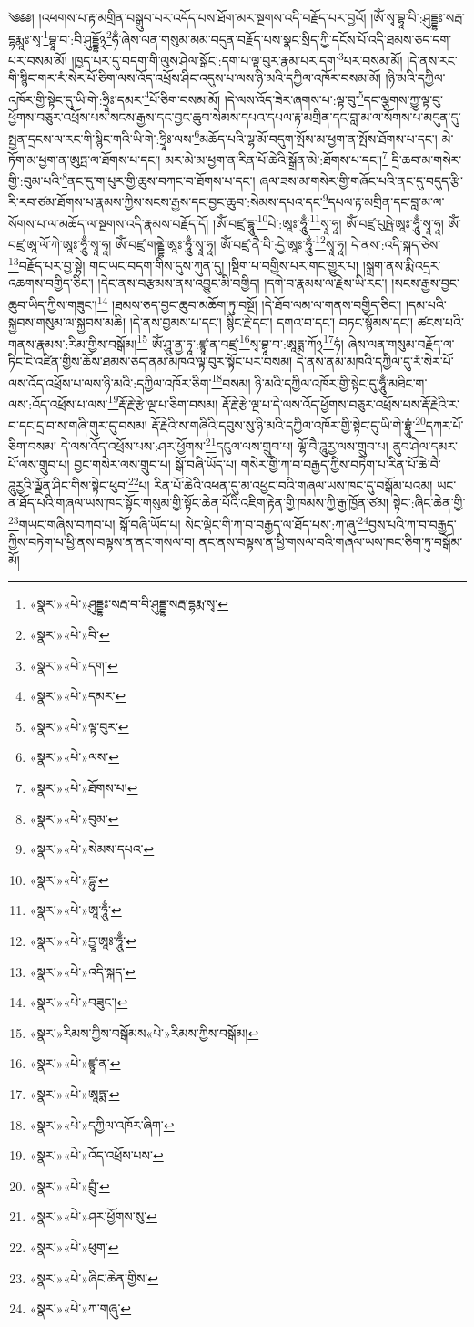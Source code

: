 ༄༅༅། །འཕགས་པ་རྟ་མགྲིན་བསྒྲུབ་པར་འདོད་པས་ཐོག་མར་སྔགས་འདི་བརྗོད་པར་བྱའོ། །ཨོཾ་སྭ་བྷཱ་བི་:ཤུདྡྷཿ་སརྦ་དྷརྨཱཿ་སྭ་\footnote{«སྣར་»«པེ་»ཤུདྡྷཿ་སརྦ་བ་བི་ཤུདྡྷ་སརྦ་དྷརྨ་སྭ་}བྷཱ་བ་:བི་ཤུདྡྷོ྅\footnote{«སྣར་»«པེ་»བི་}ཧྃ་ཞེས་ལན་གསུམ་མམ་བདུན་བརྗོད་པས་སྣང་སྲིད་ཀྱི་དངོས་པོ་འདི་ཐམས་ཅད་དག་པར་བསམ་མོ། །ཁྱད་པར་དུ་བདག་གི་ལུས་ཤེལ་སྒོང་:དག་པ་ལྟ་བུར་རྣམ་པར་དག་\footnote{«སྣར་»«པེ་»དག་}པར་བསམ་མོ། །དེ་ནས་རང་གི་སྙིང་གར་རཾ་སེར་པོ་ཅིག་ལས་འོད་འཕྲོས་ཤིང་འདུས་པ་ལས་ཉི་མའི་དཀྱིལ་འཁོར་བསམ་མོ། །ཉི་མའི་དཀྱིལ་འཁོར་གྱི་སྟེང་དུ་ཡི་གེ་:ཧྲཱིཿ་དམར་\footnote{«སྣར་»«པེ་»དམར་}པོ་ཅིག་བསམ་མོ། །དེ་ལས་འོད་ཟེར་ཞགས་པ་:ལྟ་བུ་\footnote{«སྣར་»«པེ་»ལྟ་བུར་}དང་ལྕགས་ཀྱུ་ལྟ་བུ་ཕྱོགས་བཅུར་འཕྲོས་པས་སངས་རྒྱས་དང་བྱང་ཆུབ་སེམས་དཔའ་དཔལ་རྟ་མགྲིན་དང་བླ་མ་ལ་སོགས་པ་མདུན་དུ་སྤྱན་དྲངས་ལ་རང་གི་སྙིང་གའི་ཡི་གེ་:ཧྲཱིཿ་ལས་\footnote{«སྣར་»«པེ་»ལས་}མཆོད་པའི་ལྷ་མོ་བདུག་སྤོས་མ་ཕྱག་ན་སྤོས་ཐོགས་པ་དང་། མེ་ཏོག་མ་ཕྱག་ན་ཨུཏྤ་ལ་ཐོགས་པ་དང་། མར་མེ་མ་ཕྱག་ན་རིན་པོ་ཆེའི་སྒྲོན་མེ་:ཐོགས་པ་དང་།\footnote{«སྣར་»«པེ་»ཐོགས་པ།} དྲི་ཆབ་མ་གསེར་གྱི་:བུམ་པའི་\footnote{«སྣར་»«པེ་»བུམ་}ནང་དུ་ག་པུར་གྱི་ཆུས་བཀང་བ་ཐོགས་པ་དང་། ཞལ་ཟས་མ་གསེར་གྱི་གཞོང་པའི་ནང་དུ་བདུད་རྩི་རི་རབ་ཙམ་ཐོགས་པ་རྣམས་ཀྱིས་སངས་རྒྱས་དང་བྱང་ཆུབ་:སེམས་དཔའ་དང་\footnote{«སྣར་»«པེ་»སེམས་དཔའ་}དཔལ་རྟ་མགྲིན་དང་བླ་མ་ལ་སོགས་པ་ལ་མཆོད་ལ་སྔགས་འདི་རྣམས་བརྗོད་དོ། །ཨོཾ་བཛྲ་དྷཱུ་\footnote{«སྣར་»«པེ་»དྷུ་}པེ་:ཨཱཿ་ཧཱུྃ་\footnote{«སྣར་»«པེ་»ཨཱ་ཧཱུྃ་}སྭཱ་ཧཱ། ཨོཾ་བཛྲ་པུཥྤེ་ཨཱཿ་ཧཱུྃ་སྭཱ་ཧཱ། ཨོཾ་བཛྲ་ཨཱ་ལོ་ཀེ་ཨཱཿ་ཧཱུྃ་སྭཱ་ཧཱ། ཨོཾ་བཛྲ་གནྡྷེ་ཨཱཿ་ཧཱུྃ་སྭཱ་ཧཱ། ཨོཾ་བཛྲ་ནཻ་བི་:དྱེ་ཨཱཿ་ཧཱུྃ་\footnote{«སྣར་»«པེ་»དྱཱ་ཨཱཿ་ཧཱུྃ་}སྭཱ་ཧཱ། དེ་ནས་:འདི་སྐད་ཅེས་\footnote{«སྣར་»«པེ་»འདི་སྐད་}བརྗོད་པར་བྱ་སྟེ། གང་ཡང་བདག་གིས་དུས་ཀུན་དུ། །སྡིག་པ་བགྱིས་པར་གང་གྱུར་པ། །སྐྲག་ནས་རྨི་འདྲར་འཆགས་བགྱིད་ཅིང་། །དེང་ནས་བརྩམས་ནས་འབྱུང་མི་བགྱིད། །དགེ་བ་རྣམས་ལ་རྗེས་ཡི་རང་། །སངས་རྒྱས་བྱང་ཆུབ་ཡིད་ཀྱིས་གཟུང་།\footnote{«སྣར་»«པེ་»བཟུང་།} །ཐམས་ཅད་བྱང་ཆུབ་མཆོག་ཏུ་བསྔོ། །དེ་ཐོབ་ལམ་ལ་གནས་བགྱིད་ཅིང་། །དམ་པའི་སྐྱབས་གསུམ་ལ་སྐྱབས་མཆི། །དེ་ནས་བྱམས་པ་དང་། སྙིང་རྗེ་དང་། དགའ་བ་དང་། བཏང་སྙོམས་དང་། ཚངས་པའི་གནས་རྣམས་:རིམ་གྱིས་བསྒོམ།\footnote{«སྣར་»རིམས་ཀྱིས་བསྒོམས«པེ་»རིམས་ཀྱིས་བསྒོམ།} ཨོཾ་ཤཱུ་ནྱ་ཏཱ་:ཛྙཱ་ན་བཛྲ་\footnote{«སྣར་»«པེ་»ཛྙཱ་ན་}སྭ་བྷཱ་བ་:ཨཱཏྨ་ཀོ྅\footnote{«སྣར་»«པེ་»ཨཱཏྨ་}ཧཾ། ཞེས་ལན་གསུམ་བརྗོད་ལ་ཏིང་ངེ་འཛིན་གྱིས་ཆོས་ཐམས་ཅད་ནམ་མཁའ་ལྟ་བུར་སྟོང་པར་བསམ། དེ་ནས་ནམ་མཁའི་དཀྱིལ་དུ་རཾ་སེར་པོ་ལས་འོད་འཕྲོས་པ་ལས་ཉི་མའི་:དཀྱིལ་འཁོར་ཅིག་\footnote{«སྣར་»«པེ་»དཀྱིལ་འཁོར་ཞིག་}བསམ། ཉི་མའི་དཀྱིལ་འཁོར་གྱི་སྟེང་དུ་ཧཱུྃ་མཐིང་ག་ལས་:འོད་འཕྲོས་པ་ལས་\footnote{«སྣར་»«པེ་»འོད་འཕྲོས་པས་}རྡོ་རྗེ་རྩེ་ལྔ་པ་ཅིག་བསམ། རྡོ་རྗེ་རྩེ་ལྔ་པ་དེ་ལས་འོད་ཕྱོགས་བཅུར་འཕྲོས་པས་རྡོ་རྗེའི་ར་བ་དང་དྲ་བ་ས་གཞི་གུར་དུ་བསམ། རྡོ་རྗེའི་ས་གཞིའི་དབུས་སུ་ཉི་མའི་དཀྱིལ་འཁོར་གྱི་སྟེང་དུ་ཡི་གེ་བྷྲཱུཾ་\footnote{«སྣར་»«པེ་»བྲུཾ་}དཀར་པོ་ཅིག་བསམ། དེ་ལས་འོད་འཕྲོས་པས་:ཤར་ཕྱོགས་\footnote{«སྣར་»«པེ་»ཤར་ཕྱོགས་སུ་}དངུལ་ལས་གྲུབ་པ། ལྷོ་བཻ་ཌཱུརྱ་ལས་གྲུབ་པ། ནུབ་ཤེལ་དམར་པོ་ལས་གྲུབ་པ། བྱང་གསེར་ལས་གྲུབ་པ། སྒོ་བཞི་ཡོད་པ། གསེར་གྱི་ཀ་བ་བརྒྱད་ཀྱིས་བཏེག་པ་རིན་པོ་ཆེ་བཻ་ཌཱུརྱའི་ལྗོན་ཤིང་གིས་སྟེང་ཕུབ་\footnote{«སྣར་»«པེ་»ཕུག་}པ། རིན་པོ་ཆེའི་འཕན་དུ་མ་འཕྱང་བའི་གཞལ་ཡས་ཁང་དུ་བསྒོམ་པའམ། ཡང་ན་ཐོད་པའི་གཞལ་ཡས་ཁང་སྟོང་གསུམ་གྱི་སྟོང་ཆེན་པོའི་འཇིག་རྟེན་གྱི་ཁམས་ཀྱི་རྒྱ་ཁྱོན་ཙམ། སྟེང་:ཞིང་ཆེན་གྱི་\footnote{«སྣར་»«པེ་»ཞིང་ཆེན་གྱིས་}གཡང་གཞིས་བཀབ་པ། སྒོ་བཞི་ཡོད་པ། སེང་ལྡེང་གི་ཀ་བ་བརྒྱད་ལ་ཐོད་པས་:ཀ་ཞུ་\footnote{«སྣར་»«པེ་»ཀ་གཞུ་}བྱས་པའི་ཀ་བ་བརྒྱད་ཀྱིས་བཏེག་པ་ཕྱི་ནས་བལྟས་ན་ནང་གསལ་བ། ནང་ནས་བལྟས་ན་ཕྱི་གསལ་བའི་གཞལ་ཡས་ཁང་ཅིག་ཏུ་བསྒོམ་མོ། 